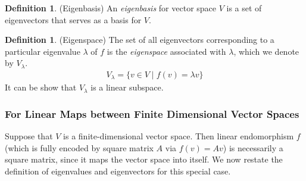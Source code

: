 \documentclass[12pt]{book}
\numberwithin{equation}{section} %
\theoremstyle{plain}
\newtheorem{prop}[thm]{Proposition}
\theoremstyle{definition}
\newtheorem{defn}[thm]{Definition}
\theoremstyle{remark}
\newcommand{\R}{\mathbb{R}}
\newcommand{\Rn}{\mathbb{R}^n}
\newcommand{\Rm}{\mathbb{R}^m}
\newcommand{\Rmm}{\mathbb{R}^{m\times m}}
\begin{document}
\begin{defn}({Eigenbasis})
An \emph{eigenbasis} for vector space $V$ is a set of eigenvectors that
serves as a basis for $V$.
\end{defn}

\begin{defn}({Eigenspace})
The set of all eigenvectors corresponding to a particular eigenvalue
$\lambda$ of $f$ is the \emph{eigenspace} associated with $\lambda$,
which we denote by $V_\lambda$.
\begin{align*}
  V_\lambda
  =
  \{ v\in V \; | \; f(v) = \lambda v \}
\end{align*}
It can be show that $V_\lambda$ is a linear subspace.
\end{defn}







\clearpage
\subsubsection{For Linear Maps between Finite Dimensional Vector Spaces}

Suppose that $V$ is a finite-dimensional vector space.
Then linear endomorphism $f$ (which is fully encoded by square matrix
$A$ via $f(v)=Av$) is necessarily a square matrix, since it maps the
vector space into itself.
We now restate the definition of eigenvalues and eigenvectors for this
special case.
\end{document}
